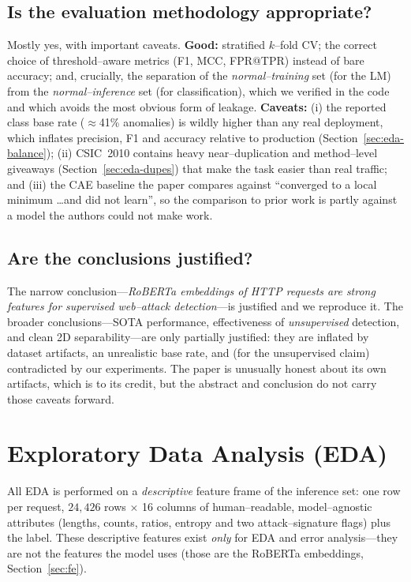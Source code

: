 \documentclass[11pt,a4paper]{article}
\begin{document}
\subsection{Is the evaluation methodology appropriate?}
Mostly yes, with important caveats. \textbf{Good:} stratified $k$--fold CV; the correct
choice of threshold--aware metrics (F1, MCC, FPR@TPR) instead of bare accuracy; and,
crucially, the separation of the \emph{normal--training} set (for the LM) from the
\emph{normal--inference} set (for classification), which we verified in the code and
which avoids the most obvious form of leakage. \textbf{Caveats:} (i) the reported class
base rate ($\approx$41\% anomalies) is wildly higher than any real deployment, which
inflates precision, F1 and accuracy relative to production
(Section~\ref{sec:eda-balance}); (ii) CSIC~2010 contains heavy near--duplication and
method--level giveaways (Section~\ref{sec:eda-dupes}) that make the task easier than
real traffic; and (iii) the CAE baseline the paper compares against ``converged to a
local minimum \dots and did not learn'', so the comparison to prior work is partly
against a model the authors could not make work.

\subsection{Are the conclusions justified?}
The narrow conclusion---\emph{RoBERTa embeddings of HTTP requests are strong features for
supervised web--attack detection}---is justified and we reproduce it. The broader
conclusions---SOTA performance, effectiveness of \emph{unsupervised} detection, and
clean 2D separability---are only partially justified: they are inflated by dataset
artifacts, an unrealistic base rate, and (for the unsupervised claim) contradicted by our
experiments. The paper is unusually honest about its own artifacts, which is to its
credit, but the abstract and conclusion do not carry those caveats forward.

\section{Exploratory Data Analysis (EDA)}
\label{sec:eda}

All EDA is performed on a \emph{descriptive} feature frame of the inference set: one row
per request, $24{,}426$ rows $\times$ 16 columns of human--readable, model--agnostic
attributes (lengths, counts, ratios, entropy and two attack--signature flags) plus the
label. These descriptive features exist \emph{only} for EDA and error analysis---they are
not the features the model uses (those are the RoBERTa embeddings,
Section~\ref{sec:fe}).
\end{document}
